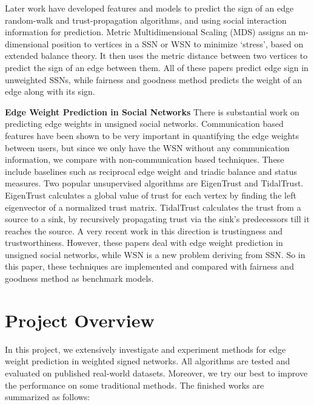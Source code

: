 \documentclass{article}
\begin{document}
Later work have developed features and models to predict the sign of an edge random-walk and trust-propagation algorithms\cite{Dubois}\cite{Guha:2004:PTD:988672.988727}, and using social interaction information for prediction\cite{Yang2012}\cite{Tang:2016:SSN:2988524.2956185}. Metric Multidimensional Scaling (MDS) assigns an m-dimensional position to vertices in a SSN or WSN to minimize ‘stress’, based on extended balance theory\cite{Qian:2014:FTD:2639948.2628438}. It then uses the metric distance between two vertices to predict the sign of an edge between them. All of these papers predict edge sign in unweighted SSNs, while fairness and goodness method predicts the weight of an edge along with its sign. 

\textbf{Edge Weight Prediction in Social Networks} There is substantial work on predicting edge weights in unsigned social networks. Communication based features have been shown to be very important in quantifying the edge weights between users\cite{Gilbert:2012:PTS:2145204.2145360}\cite{Gilbert:2009:PTS:1518701.1518736}\cite{Xiang:2010:MRS:1772690.1772790}\cite{Kahanda2009}, but since we only have the WSN without any communication information, we compare with non-communication based techniques. These include baselines such as reciprocal edge weight\cite{Gilbert:2012:PTS:2145204.2145360} and triadic balance and status measures\cite{Gilbert:2009:PTS:1518701.1518736}\cite{Sintos:2014:UST:2623330.2623664}. Two popular unsupervised algorithms are EigenTrust\cite{Kamvar:2003:EAR:775152.775242} and TidalTrust\cite{Katz2006}. EigenTrust calculates a global value of trust for each vertex by finding the left eigenvector of a normalized trust matrix. TidalTrust calculates the trust from a source to a sink, by recursively propagating trust via the sink’s predecessors till it reaches the source. A very recent work in this direction is trustingness and trustworthiness\cite{Roy2016}. However, these papers deal with edge weight prediction in unsigned social networks, while WSN is a new problem deriving from SSN. So in this paper, these techniques are implemented and compared with fairness and goodness method as benchmark models.

\section{Project Overview}

In this project, we extensively investigate and experiment methods for edge weight prediction in weighted signed networks. All algorithms are tested and evaluated on published real-world datasets. Moreover, we try our best to improve the performance on some traditional methods. The finished works are summarized as follows:
\end{document}
